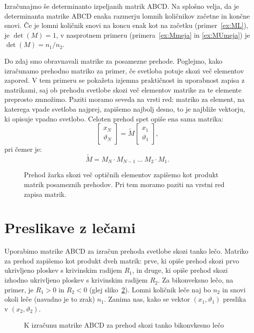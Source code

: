 Izračunajmo še determinanto izpeljanih matrik ABCD. Na splošno velja, da
je determinanta matrike ABCD enaka razmerju lomnih količnikov začetne in 
končne snovi. Če je lomni količnik snovi na koncu enak
kot na začetku (primer~\ref{ex:ML}), je $\det(M) = 1$, v nasprotnem primeru 
(primera~\ref{ex:Mmeja} in \ref{ex:MUmeja}) je $\det(M) = n_1/n_2$.

Do zdaj smo obravnavali matrike za posamezne prehode. Poglejmo, kako izračunamo
prehodno matriko za primer, če svetloba potuje skozi več elementov zapored. V tem
primeru se pokažeta izjemna praktičnost in uporabnost zapisa z matrikami, saj ob prehodu svetlobe skozi 
več elementov matrike za te elemente preprosto zmnožimo. Paziti moramo seveda
na vrsti red: matriko za element, na katerega vpade svetloba najprej, zapišemo
najbolj desno, to je najbliže vektorju, ki opisuje vpadno svetlobo. Celoten prehod
spet opiše ena sama matrika:
\begin{equation}
\left[\begin{array}{c}
x_N\\
\vartheta_N
\end{array}\right] 
= \tilde{M} \left[\begin{array}{c}
x_1\\
\vartheta_1
\end{array}\right]\!\!,
 \label{eq:02_45}
\end{equation}
pri čemer je:
\begin{equation}
\tilde{M} = M_N \cdot M_{N-1}~...~M_2 \cdot M_1.
 \label{eq:02_46}
\end{equation}
\begin{figure}[ht]
\centering
\def\svgwidth{100truemm} 

\caption{Prehod žarka skozi več optičnih elementov zapišemo kot produkt matrik posameznih prehodov.
Pri tem moramo paziti na vrstni red zapisa matrik.}
\label{fig:01_MMM}
\end{figure}

\section{Preslikave z lečami}
\label{chap:lecje}
Uporabimo matrike ABCD za izračun prehoda svetlobe skozi tanko lečo. Matriko
za prehod zapišemo kot produkt dveh matrik: prve, ki opiše
prehod skozi prvo ukrivljeno ploskev s krivinskim radijem $R_1$, 
in druge, ki opiše prehod skozi izhodno ukrivljeno ploskev s 
krivinskim radijem $R_2$. Za bikonveksno lečo, na primer, je 
$R_1>0$ in $R_2<0$ (glej sliko~\ref{fig:02_tankaleca}). 
Lomni količnik leče naj bo $n_2$ in snovi okoli leče 
(navadno je to zrak) $n_1$. Zanima nas, kako se vektor $(x_1, \vartheta_1)$ 
preslika v $(x_2, \vartheta_2)$.
\begin{figure}[!h]
\centering
\def\svgwidth{100truemm} 

\caption{K izračunu matrike ABCD za prehod skozi tanko bikonvkesno lečo}
\label{fig:02_tankaleca}
\end{figure}

